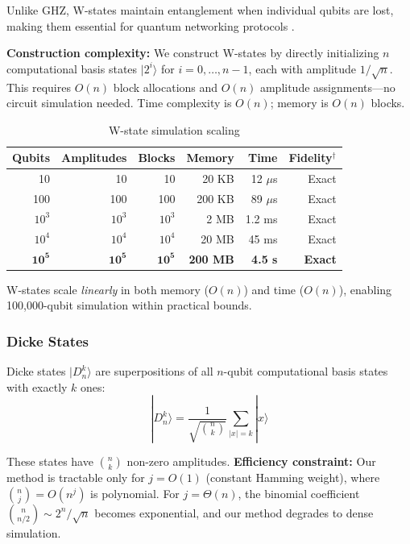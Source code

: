 \documentclass[11pt,twocolumn]{article}
\begin{document}
Unlike GHZ, W-states maintain entanglement when individual qubits are lost, making them essential for quantum networking protocols \cite{dur2000wstate}.

\textbf{Construction complexity:} We construct W-states by directly initializing $n$ computational basis states $|2^i\rangle$ for $i = 0, \ldots, n-1$, each with amplitude $1/\sqrt{n}$. This requires $O(n)$ block allocations and $O(n)$ amplitude assignments---no circuit simulation needed. Time complexity is $O(n)$; memory is $O(n)$ blocks.

\begin{table}[H]
\centering
\caption{W-state simulation scaling}
\label{tab:wstate}
\begin{tabular}{@{}rrrrrr@{}}
\toprule
Qubits & Amplitudes & Blocks & Memory & Time & Fidelity$^\dagger$ \\
\midrule
10 & 10 & 10 & 20 KB & 12 $\mu$s & Exact \\
100 & 100 & 100 & 200 KB & 89 $\mu$s & Exact \\
$10^3$ & $10^3$ & $10^3$ & 2 MB & 1.2 ms & Exact \\
$10^4$ & $10^4$ & $10^4$ & 20 MB & 45 ms & Exact \\
$\mathbf{10^5}$ & $\mathbf{10^5}$ & $\mathbf{10^5}$ & \textbf{200 MB} & \textbf{4.5 s} & \textbf{Exact} \\
\bottomrule
\end{tabular}
\end{table}

W-states scale \emph{linearly} in both memory ($O(n)$) and time ($O(n)$), enabling 100,000-qubit simulation within practical bounds.

\subsubsection{Dicke States}

Dicke states $|D_n^k\rangle$ are superpositions of all $n$-qubit computational basis states with exactly $k$ ones:
\begin{equation}
    |D_n^k\rangle = \frac{1}{\sqrt{\binom{n}{k}}}\sum_{|x|=k} |x\rangle
\end{equation}

These states have $\binom{n}{k}$ non-zero amplitudes. \textbf{Efficiency constraint:} Our method is tractable only for $j = O(1)$ (constant Hamming weight), where $\binom{n}{j} = O(n^j)$ is polynomial. For $j = \Theta(n)$, the binomial coefficient $\binom{n}{n/2} \sim 2^n/\sqrt{n}$ becomes exponential, and our method degrades to dense simulation.
\end{document}
